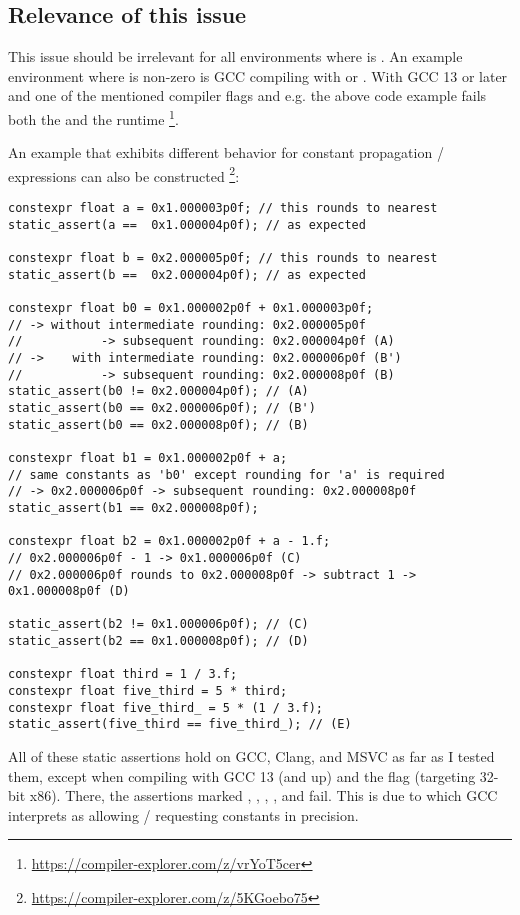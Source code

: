 \subsection{Relevance of this issue}

This issue should be irrelevant for all environments where
 is .
An example environment where  is non-zero is GCC
compiling with  or .
With GCC 13 or later and one of the mentioned compiler flags and e.g.
 the above code example fails both the 
and the runtime \footnote{\url{https://compiler-explorer.com/z/vrYoT5cer}}.

An example that exhibits different behavior for constant propagation /
expressions can also be constructed%
\footnote{\url{https://compiler-explorer.com/z/5KGoebo75}}:
\begin{lstlisting}
constexpr float a = 0x1.000003p0f; // this rounds to nearest
static_assert(a ==  0x1.000004p0f); // as expected

constexpr float b = 0x2.000005p0f; // this rounds to nearest
static_assert(b ==  0x2.000004p0f); // as expected

constexpr float b0 = 0x1.000002p0f + 0x1.000003p0f;
// -> without intermediate rounding: 0x2.000005p0f
//           -> subsequent rounding: 0x2.000004p0f (A)
// ->    with intermediate rounding: 0x2.000006p0f (B')
//           -> subsequent rounding: 0x2.000008p0f (B)
static_assert(b0 != 0x2.000004p0f); // (A)
static_assert(b0 == 0x2.000006p0f); // (B')
static_assert(b0 == 0x2.000008p0f); // (B)

constexpr float b1 = 0x1.000002p0f + a;
// same constants as 'b0' except rounding for 'a' is required
// -> 0x2.000006p0f -> subsequent rounding: 0x2.000008p0f
static_assert(b1 == 0x2.000008p0f);

constexpr float b2 = 0x1.000002p0f + a - 1.f;
// 0x2.000006p0f - 1 -> 0x1.000006p0f (C)
// 0x2.000006p0f rounds to 0x2.000008p0f -> subtract 1 -> 0x1.000008p0f (D)

static_assert(b2 != 0x1.000006p0f); // (C)
static_assert(b2 == 0x1.000008p0f); // (D)

constexpr float third = 1 / 3.f;
constexpr float five_third = 5 * third;
constexpr float five_third_ = 5 * (1 / 3.f);
static_assert(five_third == five_third_); // (E)
\end{lstlisting}
All of these static assertions hold on GCC, Clang, and MSVC as far as I tested
them, except when compiling with GCC 13 (and up) and the  flag
(targeting 32-bit x86).
There, the assertions marked ,  , ,
, and  fail.
This is due to  which GCC interprets as allowing /
requesting constants in  precision.

